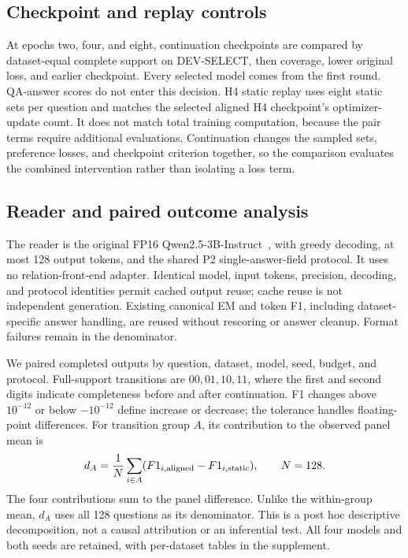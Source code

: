 \documentclass[preprint,12pt]{elsarticle}
\begin{document}
\subsection{Checkpoint and replay controls}
At epochs two, four, and eight, continuation checkpoints are compared by dataset-equal complete support on DEV-SELECT, then coverage, lower original loss, and earlier checkpoint. Every selected model comes from the first round. QA-answer scores do not enter this decision. H4 static replay uses eight static sets per question and matches the selected aligned H4 checkpoint's optimizer-update count. It does not match total training computation, because the pair terms require additional evaluations. Continuation changes the sampled sets, preference losses, and checkpoint criterion together, so the comparison evaluates the combined intervention rather than isolating a loss term.

\subsection{Reader and paired outcome analysis}
The reader is the original FP16 Qwen2.5-3B-Instruct~\cite{qwen2024release}, with greedy decoding, at most 128 output tokens, and the shared P2 single-answer-field protocol. It uses no relation-front-end adapter. Identical model, input tokens, precision, decoding, and protocol identities permit cached output reuse; cache reuse is not independent generation. Existing canonical EM and token F1, including dataset-specific answer handling, are reused without rescoring or answer cleanup. Format failures remain in the denominator.

We paired completed outputs by question, dataset, model, seed, budget, and protocol. Full-support transitions are $00,01,10,11$, where the first and second digits indicate completeness before and after continuation. F1 changes above $10^{-12}$ or below $-10^{-12}$ define increase or decrease; the tolerance handles floating-point differences. For transition group $A$, its contribution to the observed panel mean is
\begin{equation}\label{eq:decomp}
d_A=\frac{1}{N}\sum_{i\in A}(F1_{i,\rm aligned}-F1_{i,\rm static}),\qquad N=128.
\end{equation}
The four contributions sum to the panel difference. Unlike the within-group mean, $d_A$ uses all 128 questions as its denominator. This is a post hoc descriptive decomposition, not a causal attribution or an inferential test. All four models and both seeds are retained, with per-dataset tables in the supplement.
\end{document}
